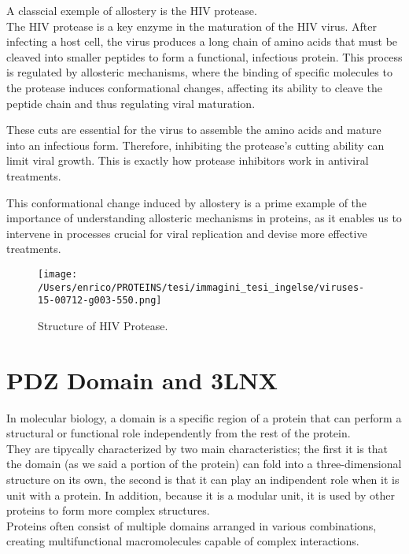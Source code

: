 \documentclass[English, Lau, oneside]{sapthesis}
\begin{document}
A classcial exemple of allostery is the HIV protease.\\
The HIV protease is a key enzyme in the maturation of the HIV virus. After infecting a host cell, the virus produces a long chain of amino acids that must be cleaved into smaller peptides to form a functional, infectious protein. This process is regulated by allosteric mechanisms, where the binding of specific molecules to the protease induces conformational changes, affecting its ability to cleave the peptide chain and thus regulating viral maturation.

These cuts are essential for the virus to assemble the amino acids and mature into an infectious form. Therefore, inhibiting the protease's cutting ability can limit viral growth. This is exactly how protease inhibitors work in antiviral treatments.

This conformational change induced by allostery is a prime example of the importance of understanding allosteric mechanisms in proteins, as it enables us to intervene in processes crucial for viral replication and devise more effective treatments.

\begin{figure}[h]
    \centering
    \texttt{[image: /Users/enrico/PROTEINS/tesi/immagini\_tesi\_ingelse/viruses-15-00712-g003-550.png]}
    \caption{Structure of HIV Protease.}
    \label{fig:HIV}
\end{figure}



\newpage


\section{PDZ Domain and 3LNX}
\noindent  In molecular biology, a domain is a specific region of a protein that can perform a structural or functional role independently from the rest of the protein.\cite{ref8} \\
They are tipycally characterized by two main characteristics; the first it is that the domain (as we said a portion of the protein) can fold into a three-dimensional structure on its own, the second is that it can play an indipendent role when it is unit with a protein.
In addition, because it is a modular unit, it is used by other proteins to form more complex structures.\cite{ref8} \\
Proteins often consist of multiple domains arranged in various combinations, creating multifunctional macromolecules capable of complex interactions. 
\end{document}
